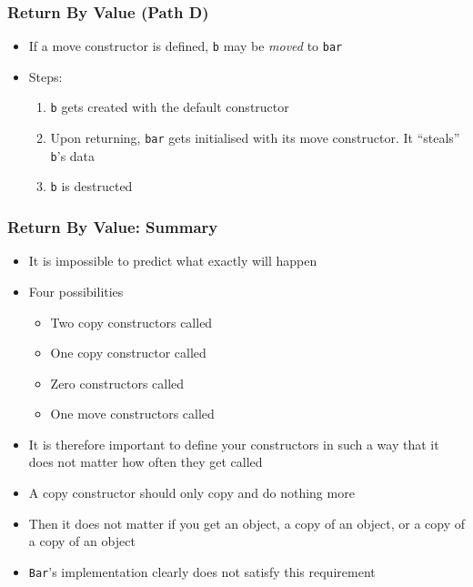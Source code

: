 \begin{frame}
  \frametitle{Return By Value (Path D)}
  \begin{itemize}
    \item If a move constructor is defined, {\tt b}
          may be \emph{moved} to {\tt bar}
    \item Steps:
          \begin{enumerate}
            \item {\tt b} gets created with the default constructor
            \item Upon returning, {\tt bar} gets initialised with its move constructor.
                  It ``steals'' {\tt b}'s data
            \item {\tt b} is destructed
          \end{enumerate}
  \end{itemize}
\end{frame}

\begin{frame}
  \frametitle{Return By Value: Summary}
  \begin{itemize}
    \item It is impossible to predict what exactly will happen
    \item Four possibilities
          \begin{itemize}
            \item Two copy constructors called
            \item One copy constructor called
            \item Zero constructors called
            \item One move constructors called
          \end{itemize}
    \item It is therefore important to define your constructors in such a way
          that it does not matter how often they get called
    \item A copy constructor should only copy and do nothing more
    \item Then it does not matter if you get an object, a copy of an object, or a copy of a copy of an object
    \item {\tt Bar}'s implementation clearly does not satisfy this requirement
  \end{itemize}
\end{frame}

